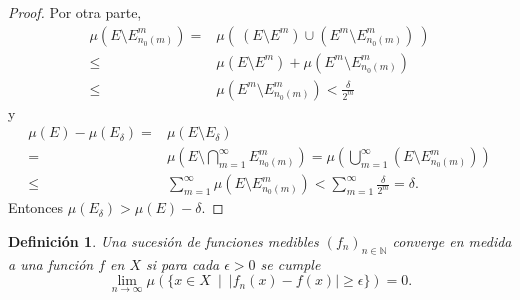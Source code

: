 \documentclass[twoside,12pt,a4 paper,openright]{book}
\newtheorem{defi}[claim]{Definici\'on}
\begin{document}
\begin{proof}
    Por otra parte, 
   \begin{align*}
   \displaystyle \mu\left(E\setminus E_{n_0(m)}^m\right) = & \mu\left(   \  ( E \setminus E^m) \cup  (E^m \setminus E_{n_0(m)}^m) \ \right)  \\ 
      \leq  &  \mu\left(    E \setminus E^m  \right)   +   \mu\left(  E^m \setminus E_{n_0(m)}^m   \right)   \\
      \leq   & \mu(E^m\setminus E_{n_0(m)}^m)<\frac{\delta}{2^m} 
      \end{align*} y 
                \begin{align*}
                                 \mu(E)- \mu(E_\delta) = &                  \mu(E\setminus E_\delta) \\ 
             = &  \mu\left(E\setminus\bigcap_{m=1}^{\infty}E_{n_0(m)}^m\right) = \mu\left(\bigcup_{m=1}^{\infty} (E\setminus E_{n_0(m)}^m)\right)\\
                 \leq & \sum_{m=1}^{\infty}\mu(E\setminus E_{n_0(m)}^m) <  \sum_{m=1}^{\infty}  \frac{\delta}{2^m} =\delta .  
                 \end{align*} 
Entonces      $\mu(E_\delta)>\mu(E) - \delta$.


\end{proof}



\begin{defi}Una sucesi\'on de funciones medibles $(f_n)_{n\in \mathbb N}$  converge en medida a una funci\'on   $f$ en $X$ si  para cada $\epsilon> 0$ se cumple 
$$ \lim_{n\to \infty } \mu( \{  x\in X \ \mid \  |f_n(x)- f(x)| \geq \epsilon \} )=0.$$

\end{defi}
\end{document}
